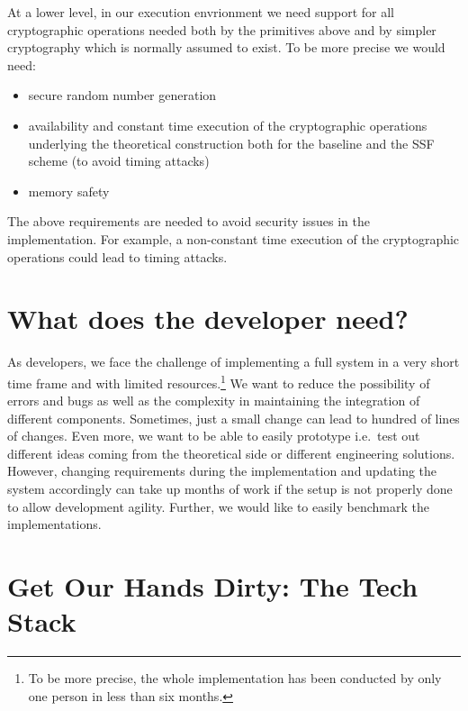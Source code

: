At a lower level, in our execution envrionment 
we need support for all cryptographic operations
needed both by the primitives above and by simpler
cryptography which is normally assumed to exist. 
To be more precise we would need:
\begin{itemize}
    \item secure random number generation
    \item availability and constant time execution of the cryptographic operations underlying the theoretical construction both for the baseline and the SSF scheme (to avoid timing attacks) 
    \item memory safety 
\end{itemize}
The above requirements are needed to avoid security
issues in the implementation. For example, a non-constant
time execution of the cryptographic operations could
lead to timing attacks.

\section{What does the developer need?}\label{sc:developer}

As developers, we face the challenge of implementing a full
system in a very short time frame and with limited resources.\footnote{To be more precise, the whole implementation has been conducted by only one person in less than six months.}
We want to reduce the possibility of errors and bugs
as well as the complexity in maintaining the integration of
different components.
Sometimes, just a small change can lead to
hundred of lines of changes.
Even more, we want to be able to easily prototype i.e.\ 
test out different ideas coming from the theoretical side
or different engineering solutions.
However, changing requirements during the implementation
and updating the system accordingly can take up months of work
if the setup is not properly done to allow development agility.
Further, we would like to easily benchmark the implementations.

\section{Get Our Hands Dirty: The Tech Stack}\label{sc:tech-stack}

